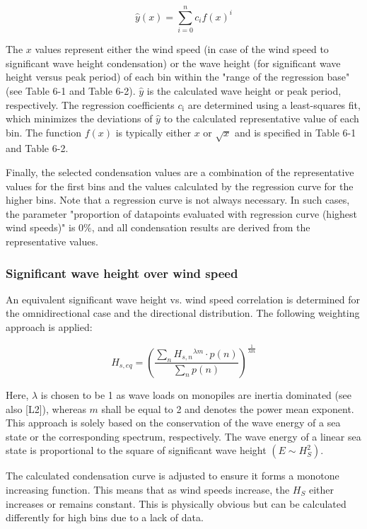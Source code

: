$$
\hat{y}(x)=\sum_{i=0}^{n} c_{i} f(x)^{i}
$$

The $x$ values represent either the wind speed (in case of the wind speed to significant wave height condensation) or the wave height (for significant wave height versus peak period) of each bin within the "range of the regression base" (see Table 6-1 and Table 6-2). $\hat{y}$ is the calculated wave height or peak period, respectively. The regression coefficients $c_{\mathrm{i}}$ are determined using a least-squares fit, which minimizes the deviations of $\hat{y}$ to the calculated representative value of each bin. The function $f(x)$ is typically either $x$ or $\sqrt{x}$ and is specified in Table 6-1 and Table 6-2.

Finally, the selected condensation values are a combination of the representative values for the first bins and the values calculated by the regression curve for the higher bins. Note that a regression curve is not always necessary. In such cases, the parameter "proportion of datapoints evaluated with regression curve (highest wind speeds)" is $0 \%$, and all condensation results are derived from the representative values.



\subsubsection{Significant wave height over wind speed}
An equivalent significant wave height vs. wind speed correlation is determined for the omnidirectional case and the directional distribution. The following weighting approach is applied:

$$
H_{s, e q}=\left(\frac{\sum_{n} H_{s, n}{ }^{\lambda m} \cdot p(n)}{\sum_{n} p(n)}\right)^{\frac{1}{\lambda m}}
$$

Here, $\lambda$ is chosen to be 1 as wave loads on monopiles are inertia dominated (see also [L2]), whereas $m$ shall be equal to 2 and denotes the power mean exponent. This approach is solely based on the conservation of the wave energy of a sea state or the corresponding spectrum, respectively. The wave energy of a linear sea state is proportional to the square of significant wave height $\left(E \sim H_{S}^{2}\right)$.

The calculated condensation curve is adjusted to ensure it forms a monotone increasing function. This means that as wind speeds increase, the $H_{S}$ either increases or remains constant. This is physically obvious but can be calculated differently for high bins due to a lack of data.

